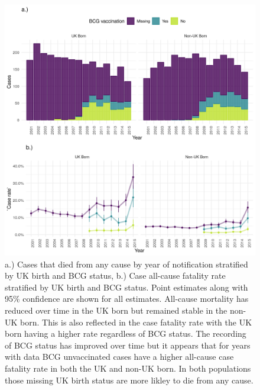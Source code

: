 \documentclass[11pt,twoside]{bristolthesis}
\begin{document}
  \begin{figure}
  
  {\centering \includegraphics[width=0.8\linewidth,]{chapters/tb-epi-england/figures/plot-all-mort-case-rate} 
  
  }
  
  \caption[a.) Cases that died from any cause by year of notification stratified by UK birth and BCG status, b.) Case all-cause fatality rate stratified by UK birth and BCG status.]{a.) Cases that died from any cause by year of notification stratified by UK birth and BCG status, b.) Case all-cause fatality rate stratified by UK birth and BCG status. Point estimates along with 95\% confidence are shown for all estimates. All-cause mortality has reduced over time in the UK born but remained stable in the non-UK born. This is also reflected in the case fatality rate with the UK born having a higher rate regardless of BCG status. The recording of BCG status has improved over time but it appears that for years with data BCG unvaccinated cases have a higher all-cause case fatality rate in both the UK and non-UK born. In both populations those missing UK birth status are more likley to die from any cause.}\label{fig:plot-all-mort-case-rate}
  \end{figure}
\end{document}
